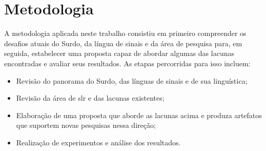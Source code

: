 \section{Metodologia}
\label{sec:introducao-metodologia}

A metodologia aplicada neste trabalho consistiu em primeiro compreender os desafios atuais do Surdo, da língua de sinais e da área de pesquisa para, em seguida, estabelecer uma proposta capaz de abordar algumas das lacunas encontradas e avaliar seus resultados.
As etapas percorridas para isso incluem:


\begin{itemize}
    \item Revisão do panorama do Surdo, das línguas de sinais e de sua linguística;
    \item Revisão da área de \acrlong{slr} e das lacunas existentes;
    \item Elaboração de uma proposta que aborde as lacunas acima e produza artefatos que suportem novas pesquisas nessa direção;
    \item Realização de experimentos e análise dos resultados.
\end{itemize}


